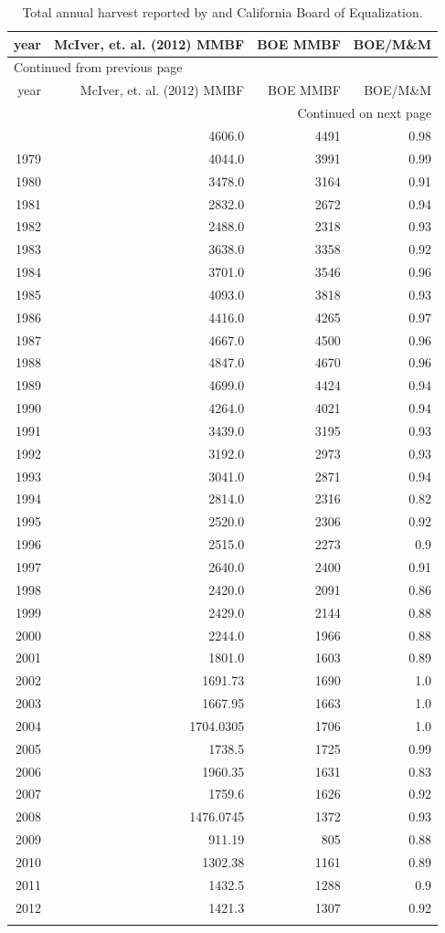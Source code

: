 \documentclass[a4paper]{article}
\begin{document}
\begin{longtable}{rrrr}
year & McIver, et. al. (2012) MMBF & BOE MMBF & BOE/M\&M\\
\hline
\endfirsthead
\multicolumn{4}{l}{Continued from previous page} \\
\hline

year & McIver, et. al. (2012) MMBF & BOE MMBF & BOE/M\&M \\

\hline
\endhead
\hline\multicolumn{4}{r}{Continued on next page} \\
\endfoot
\endlastfoot
\hline
1978 & 4606.0 & 4491 & 0.98\\
1979 & 4044.0 & 3991 & 0.99\\
1980 & 3478.0 & 3164 & 0.91\\
1981 & 2832.0 & 2672 & 0.94\\
1982 & 2488.0 & 2318 & 0.93\\
1983 & 3638.0 & 3358 & 0.92\\
1984 & 3701.0 & 3546 & 0.96\\
1985 & 4093.0 & 3818 & 0.93\\
1986 & 4416.0 & 4265 & 0.97\\
1987 & 4667.0 & 4500 & 0.96\\
1988 & 4847.0 & 4670 & 0.96\\
1989 & 4699.0 & 4424 & 0.94\\
1990 & 4264.0 & 4021 & 0.94\\
1991 & 3439.0 & 3195 & 0.93\\
1992 & 3192.0 & 2973 & 0.93\\
1993 & 3041.0 & 2871 & 0.94\\
1994 & 2814.0 & 2316 & 0.82\\
1995 & 2520.0 & 2306 & 0.92\\
1996 & 2515.0 & 2273 & 0.9\\
1997 & 2640.0 & 2400 & 0.91\\
1998 & 2420.0 & 2091 & 0.86\\
1999 & 2429.0 & 2144 & 0.88\\
2000 & 2244.0 & 1966 & 0.88\\
2001 & 1801.0 & 1603 & 0.89\\
2002 & 1691.73 & 1690 & 1.0\\
2003 & 1667.95 & 1663 & 1.0\\
2004 & 1704.0305 & 1706 & 1.0\\
2005 & 1738.5 & 1725 & 0.99\\
2006 & 1960.35 & 1631 & 0.83\\
2007 & 1759.6 & 1626 & 0.92\\
2008 & 1476.0745 & 1372 & 0.93\\
2009 & 911.19 & 805 & 0.88\\
2010 & 1302.38 & 1161 & 0.89\\
2011 & 1432.5 & 1288 & 0.9\\
2012 & 1421.3 & 1307 & 0.92\\
\caption{Total annual harvest reported by \citet{Mciver2012} and California Board of Equalization.}
\\
\end{longtable}
\end{document}
